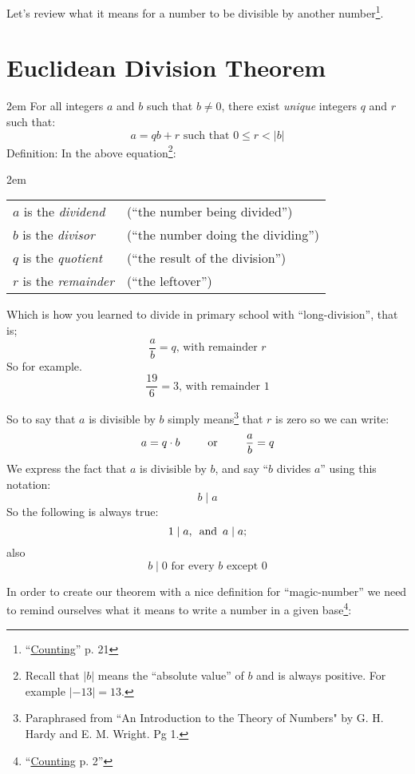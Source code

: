 \documentclass{article}
\newenvironment{jprIn}{\begin{adjustwidth}{2em}{}}{\end{adjustwidth}}
\begin{document}
Let's review what it means for a number to be divisible 
by another
number\footnote{``\href {https://www.dropbox.com/s/bwmrffmkcidnf27/basisReprThm.pdf?dl=0} {Counting}'' p. 21}.

\break
\section*{Euclidean Division Theorem}
\begin{jprIn}
For all integers $a$ and $b$ such that $b\ne0$,
there exist \emph{unique} integers $q$ and $r$ such that:
\[a=qb+r  \text{ such that } 0\le{}r<\lvert{}b\rvert\]
Definition: In the above equation\footnote{Recall
that $\lvert{}b\rvert$ means the ``absolute value'' of $b$ and is always positive. For
example $\lvert{}{-13}\rvert = 13$.}:
\begin{jprIn}
\begin{tabular}{l l}
\(a\) is the \emph{dividend} & (``the number being divided'')\\
\(b\) is the \emph{divisor} & (``the number doing the dividing'')\\
\(q\) is the \emph{quotient} & (``the result of the division'')\\
\(r\) is the \emph{remainder} & (``the leftover'')
\end{tabular}
\end{jprIn}
\end{jprIn}

Which is how you learned to divide in primary school with ``long-division'', that is;
\[\frac{a}{b}=q\text{, with remainder }r\]
So for example.
\[\frac{19}{6}=3\text{, with remainder }1\]

So to say that $a$ is divisible by $b$ simply means\footnote{Paraphrased
from ``An Introduction to the Theory of Numbers" by G. H. Hardy
and E. M. Wright. Pg 1.}
that $r$ is zero
so we can write:
\[a=q\cdot{}b\text{\hspace{2.5em}or\hspace{2.5em}}\frac{a}{b}=q\]
We express the fact that $a$ is divisible by $b$, and say
``$b$ divides $a$'' using this notation:
\[b\mid{}a\]
So the following is always true:
\[1\mid{}a,
\text{\hspace{0.5em}and\hspace{0.5em}}a\mid{}a;\]
also
\[b\mid{}0\text{ for every }b\text{ except }0\]

In order to create our theorem with a 
nice definition for ``magic-number''
we need to remind ourselves 
what it means to write a number in a given
base\footnote{``\href{https://www.dropbox.com/s/bwmrffmkcidnf27/basisReprThm.pdf?dl=0} {Counting} p. 2''}:
\end{document}
